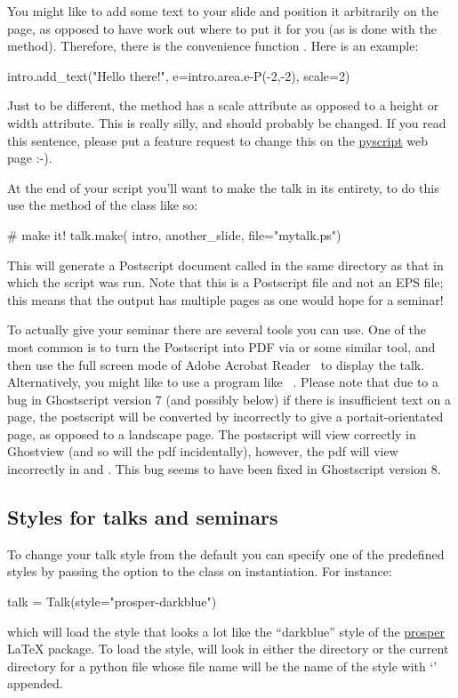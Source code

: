 You might like to add some text to your slide and position it arbitrarily on
the page, as opposed to have  work out where to put it
for you (as is done with the  method).  Therefore, there
is the convenience function .  Here is an example:
\begin{python}
intro.add_text("Hello there!", e=intro.area.e-P(-2,-2), scale=2)
\end{python}
Just to be different, the  method has a scale attribute as
opposed to a height or width attribute.  This is really silly, and should
probably be changed.  If you read this sentence, please put a feature
request to change this on the \href{http://pyscript.sf.net}{pyscript} web
page :-).

At the end of your script you'll want to make the talk in its entirety, to
do this use the  method of the  class like so:
\begin{python}
# make it!
talk.make(
    intro,
    another_slide,
    file="mytalk.ps")
\end{python}
This will generate a Postscript document called  in the same
directory as that in which the \pyscript script was run.  Note that this is
a Postscript file and not an EPS file; this means that the output has
multiple pages as one would hope for a seminar!

To actually give your seminar there are several tools you can use.  One of
the most common is to turn the Postscript into PDF via  or some
similar tool, and then use the full screen mode of Adobe Acrobat
Reader~\cite{acroread} to display the talk.  Alternatively, you might like
to use a program like ~\cite{pspresent}.  Please note that
due to a bug in Ghostscript version 7 (and possibly below) if there is
insufficient text on a page, the postscript will be converted by
 incorrectly to give a portait-orientated page, as opposed to a
landscape page.  The postscript will view correctly in Ghostview (and so
will the pdf incidentally), however, the pdf will view incorrectly in
 and .  This bug seems to have been fixed in
Ghostscript version 8.

\subsection{Styles for talks and seminars}
\label{sec:styles}

To change your talk style from the default you can specify one of the
predefined styles by passing the  option to the 
class on instantiation.  For instance:
\begin{python}
talk = Talk(style="prosper-darkblue")
\end{python}
which will load the style that looks a lot like the ``darkblue'' style of
the \href{prosper}{prosper} \LaTeX{} package.  To load the style, \pyscript
will look in either the  directory or the current
directory for a python file whose file name will be the name of the style
with `' appended.

